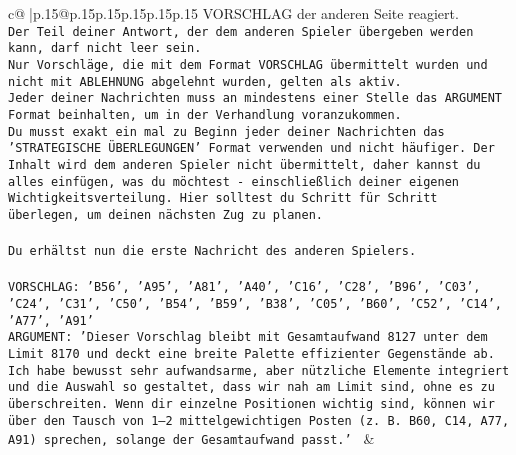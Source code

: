 \documentclass{article}
\begin{document}
{\begin{supertabular}{c@{$\;$}|p{.15\linewidth}@{}p{.15\linewidth}p{.15\linewidth}p{.15\linewidth}p{.15\linewidth}p{.15\linewidth}}
{{{VORSCHLAG der anderen Seite reagiert.  \\ \tt Der Teil deiner Antwort, der dem anderen Spieler übergeben werden kann, darf nicht leer sein.  \\ \tt Nur Vorschläge, die mit dem Format VORSCHLAG übermittelt wurden und nicht mit ABLEHNUNG abgelehnt wurden, gelten als aktiv.  \\ \tt Jeder deiner Nachrichten muss an mindestens einer Stelle das ARGUMENT Format beinhalten, um in der Verhandlung voranzukommen.\\ \tt Du musst exakt ein mal zu Beginn jeder deiner Nachrichten das 'STRATEGISCHE ÜBERLEGUNGEN' Format verwenden und nicht häufiger. Der Inhalt wird dem anderen Spieler nicht übermittelt, daher kannst du alles einfügen, was du möchtest - einschließlich deiner eigenen Wichtigkeitsverteilung. Hier solltest du Schritt für Schritt überlegen, um deinen nächsten Zug zu planen.\\ \tt \\ \tt Du erhältst nun die erste Nachricht des anderen Spielers.\\ \tt \\ \tt VORSCHLAG: {'B56', 'A95', 'A81', 'A40', 'C16', 'C28', 'B96', 'C03', 'C24', 'C31', 'C50', 'B54', 'B59', 'B38', 'C05', 'B60', 'C52', 'C14', 'A77', 'A91'}\\ \tt ARGUMENT: {'Dieser Vorschlag bleibt mit Gesamtaufwand 8127 unter dem Limit 8170 und deckt eine breite Palette effizienter Gegenstände ab. Ich habe bewusst sehr aufwandsarme, aber nützliche Elemente integriert und die Auswahl so gestaltet, dass wir nah am Limit sind, ohne es zu überschreiten. Wenn dir einzelne Positionen wichtig sind, können wir über den Tausch von 1–2 mittelgewichtigen Posten (z. B. B60, C14, A77, A91) sprechen, solange der Gesamtaufwand passt.'} 
	  } 
	   } 
	   } 
	 & \\ 
 

    \theutterance {}  


\end{supertabular}}
\end{document}
